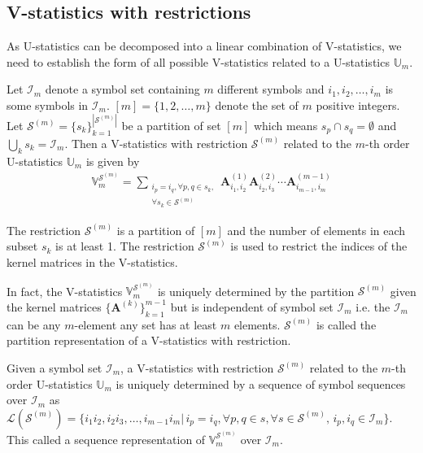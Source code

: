 \documentclass{biometrika}
\renewcommand{\_}{\raisebox{.5pt}{\underline{\phantom{x}}}}
\def\bbU{\mathbb{U}}
\def\bbV{\mathbb{V}}
\def\bA{\mathbf{A}}
\def\calS{\mathcal{S}}
\def\calI{\mathcal{I}}
\begin{document}
\begin{bibunit}[biometrika]
\subsection{V-statistics with restrictions}
As U-statistics can be decomposed into a linear combination of V-statistics,
we need to establish the form of all possible V-statistics related to a U-statistics $\bbU_m$.

\begin{definition}
    Let $\mathcal{I}_m$ denote a symbol set containing $m$ different symbols and $i_1, i_2, \ldots, i_m$ is some symbols in $\calI_m$.
    $[m] = \{1, 2, \ldots, m\}$ denote the set of $m$ positive integers. Let $\calS^{(m)} = \{s_k\}_{k=1}^{|\calS^{(m)}|}$ be a partition of set $[m]$ which means $s_p \cap s_q = \emptyset$ and $\bigcup_k{s_k} = \mathcal{I}_m$.
    Then a V-statistics with restriction $\calS^{(m)}$ related to the $m$-th order U-statistics $\bbU_m$ is given by
    \begin{align*}
        \bbV_{m}^{\mathcal{S}^{(m)}} = \sum_{\substack{i_p = i_q, \forall p, q \in s_k, \\ \forall s_k \in \mathcal{S}^{(m)}}} \bA^{(1)}_{i_1,i_2} \bA^{(2)}_{i_2,i_3} \cdots \bA^{(m-1)}_{i_{m-1}, i_m}
    \end{align*}
\end{definition}

\begin{remark}
    The restriction $\calS^{(m)}$ is a partition of $[m]$ and the number of elements in each subset $s_k$ is at least 1. The restriction $\calS^{(m)}$ is used to restrict the indices of the kernel matrices in the V-statistics.
\end{remark}

\begin{remark}
    In fact, the V-statistics $\bbV_{m}^{\mathcal{S}^{(m)}}$ is uniquely determined by the partition $\calS^{(m)}$ given the kernel matrices $\{\bA^{(k)}\}_{k=1}^{m-1}$ but is independent of symbol set $\calI_m$ i.e. the $\calI_m$ can be any $m$-element any set has at least $m$ elements. $\calS^{(m)}$ is called the partition representation of a V-statistics with restriction. 
\end{remark}

\begin{remark}
    Given a symbol set $\calI_m$, a V-statistics with restriction $\calS^{(m)}$ related to the $m$-th order U-statistics $\bbU_m$ is uniquely determined by a sequence of symbol sequences over $\calI_m$ as $\mathcal{L}(\calS^{(m)}) = \{i_1i_2, i_2i_3, \ldots, i_{m-1}i_m |\, i_p = i_q, \forall p, q \in s, \forall s \in \calS^{(m)}, \, i_p, i_q \in \calI_m \}$. This called a sequence representation of $\bbV_{m}^{\mathcal{S}^{(m)}}$ over $\calI_m$. 
\end{remark}


\end{bibunit}
\end{document}
